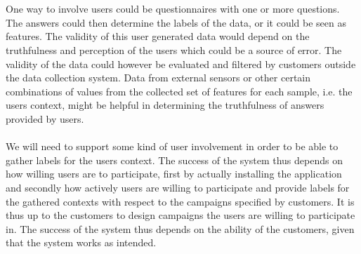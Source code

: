 \\\\
One way to involve users could be questionnaires with one or more questions. The answers could then determine the labels of the data, or it could be seen as features. The validity of this user generated data would depend on the truthfulness and perception of the users which could be a source of error. The validity of the data could however be evaluated and filtered by customers outside the data collection system. Data from external sensors or other certain combinations of values from the collected set of features for each sample, i.e. the users context, might be helpful in determining the truthfulness of answers provided by users.
\\\\
We will need to support some kind of user involvement in order to be able to gather labels for the users context. The success of the system thus depends on how willing users are to participate, first by actually installing the application and secondly how actively users are willing to participate and provide labels for the gathered contexts with respect to the campaigns specified by customers. It is thus up to the customers to design campaigns the users are willing to participate in. The success of the system thus depends on the ability of the customers, given that the system works as intended.
